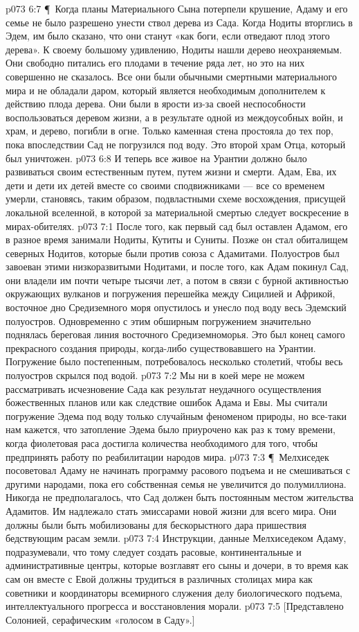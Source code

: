 \vs p073 6:7 \P\ Когда планы Материального Сына потерпели крушение, Адаму и его семье не было разрешено унести ствол дерева из Сада. Когда Нодиты вторглись в Эдем, им было сказано, что они станут «как боги, если отведают плод этого дерева». К своему большому удивлению, Нодиты нашли дерево неохраняемым. Они свободно питались его плодами в течение ряда лет, но это на них совершенно не сказалось. Все они были обычными смертными материального мира и не обладали даром, который является необходимым дополнителем к действию плода дерева. Они были в ярости из\hyp{}за своей неспособности воспользоваться деревом жизни, а в результате одной из междоусобных войн, и храм, и дерево, погибли в огне. Только каменная стена простояла до тех пор, пока впоследствии Сад не погрузился под воду. Это второй храм Отца, который был уничтожен.
\vs p073 6:8 И теперь все живое на Урантии должно было развиваться своим естественным путем, путем жизни и смерти. Адам, Ева, их дети и дети их детей вместе со своими сподвижниками --- все со временем умерли, становясь, таким образом, подвластными схеме восхождения, присущей локальной вселенной, в которой за материальной смертью следует воскресение в мирах\hyp{}обителях.
\vs p073 7:1 После того, как первый сад был оставлен Адамом, его в разное время занимали Нодиты, Кутиты и Суниты. Позже он стал обиталищем северных Нодитов, которые были против союза с Адамитами. Полуостров был завоеван этими низкоразвитыми Нодитами, и после того, как Адам покинул Сад, они владели им почти четыре тысячи лет, а потом в связи с бурной активностью окружающих вулканов и погружения перешейка между Сицилией и Африкой, восточное дно Средиземного моря опустилось и унесло под воду весь Эдемский полуостров. Одновременно с этим обширным погружением значительно поднялась береговая линия восточного Средиземноморья. Это был конец самого прекрасного создания природы, когда\hyp{}либо существовавшего на Урантии. Погружение было постепенным, потребовалось несколько столетий, чтобы весь полуостров скрылся под водой.
\vs p073 7:2 Мы ни в коей мере не можем рассматривать исчезновение Сада как результат неудачного осуществления божественных планов или как следствие ошибок Адама и Евы. Мы считали погружение Эдема под воду только случайным феноменом природы, но все\hyp{}таки нам кажется, что затопление Эдема было приурочено как раз к тому времени, когда фиолетовая раса достигла количества необходимого для того, чтобы предпринять работу по реабилитации народов мира.
\vs p073 7:3 \P\ Мелхиседек посоветовал Адаму не начинать программу расового подъема и не смешиваться с другими народами, пока его собственная семья не увеличится до полумиллиона. Никогда не предполагалось, что Сад должен быть постоянным местом жительства Адамитов. Им надлежало стать эмиссарами новой жизни для всего мира. Они должны были быть мобилизованы для бескорыстного дара пришествия бедствующим расам земли.
\vs p073 7:4 Инструкции, данные Мелхиседеком Адаму, подразумевали, что тому следует создать расовые, континентальные и административные центры, которые возглавят его сыны и дочери, в то время как сам он вместе с Евой должны трудиться в различных столицах мира как советники и координаторы всемирного служения делу биологического подъема, интеллектуального прогресса и восстановления морали.
\vs p073 7:5 [Представлено Солонией, серафическим «голосом в Саду».]
